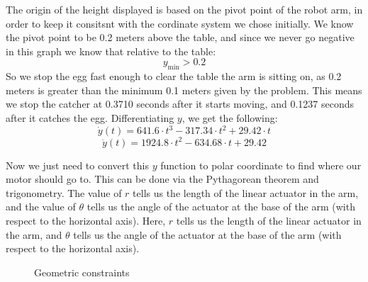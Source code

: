 \documentclass[nofoot,pdf-a,balance,colorlinks,upint,subscriptcorrection,varvw,mathalfa=cal=boondoxo]{asmeconf}
\begin{document}
	The origin of the height displayed is based on the pivot point of the robot arm, in order to keep it consitsnt with the cordinate system we chose initially. We know the pivot point to be 0.2 meters above the table, and since we never go negative in this graph we know that relative to the table:
	\begin{equation}
	y_{\textrm{min}} > 0.2
	\end{equation}
	So we stop the egg fast enough to clear the table the arm is sitting on, as 0.2 meters is greater than the minimum 0.1 meters given by the problem. This means we stop the catcher at 0.3710 seconds after it starts moving, and 0.1237 seconds after it catches the egg.\newline
    Differentiating $y$, we get the following:
    \begin{equation}\label{y_velocity}
        \dot{y}\left(t\right) = 641.6 \cdot t^3 - 317.34 \cdot t^2 + 29.42 \cdot t
    \end{equation}
    \begin{equation}\label{y_acceleration}
        \ddot{y}\left(t\right) = 1924.8 \cdot t^2 - 634.68 \cdot t + 29.42
    \end{equation}


	Now we just need to convert this $y$ function to polar coordinate to find where our motor should go to. This can be done via the Pythagorean theorem and trigonometry. The value of $r$ tells us the length of the linear actuator in the arm, and the value of $\theta$ tells us the angle of the actuator at the base of the arm (with respect to the horizontal axis). Here, $r$ tells us the length of the linear actuator in the arm, and $\theta$ tells us the angle of the actuator at the base of the arm (with respect to the horizontal axis). 

    \begin{figure}[H]
        \centering
        \caption{Geometric constraints}
    \end{figure}
\end{document}
